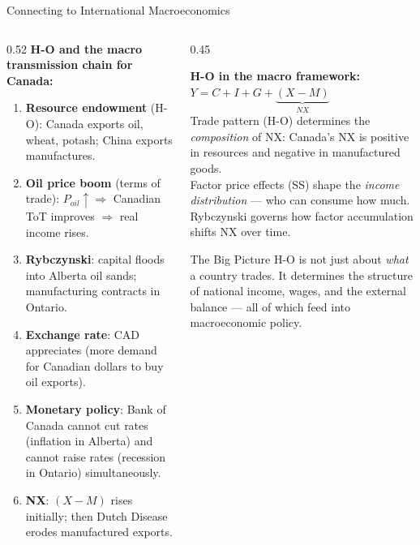 \documentclass[aspectratio=169]{beamer}
\begin{document}
\begin{frame}[shrink=15]{Connecting to International Macroeconomics}
\begin{columns}[T]
\begin{column}{0.52\textwidth}
\textbf{H-O and the macro transmission chain for Canada:}
\begin{enumerate}\small
  \item \textbf{Resource endowment} (H-O): Canada exports
        oil, wheat, potash; China exports manufactures.
  \item \textbf{Oil price boom} (terms of trade):
        $P_{oil}\uparrow \Rightarrow$ Canadian ToT improves
        $\Rightarrow$ real income rises.
  \item \textbf{Rybczynski}: capital floods into Alberta
        oil sands; manufacturing contracts in Ontario.
  \item \textbf{Exchange rate}: CAD appreciates (more
        demand for Canadian dollars to buy oil exports).
  \item \textbf{Monetary policy}: Bank of Canada cannot
        cut rates (inflation in Alberta) and cannot
        raise rates (recession in Ontario) simultaneously.
  \item \textbf{NX}: $(X-M)$ rises initially; then Dutch
        Disease erodes manufactured exports.
\end{enumerate}
\end{column}
\begin{column}{0.45\textwidth}
\begin{varbox}
\small\textbf{H-O in the macro framework:}\\[0.3em]
$Y = C + I + G + \underbrace{(X-M)}_{NX}$\\[0.3em]
Trade pattern (H-O) determines the \emph{composition}
of NX: Canada's NX is positive in resources and
negative in manufactured goods.\\[0.3em]
Factor price effects (SS) shape the \emph{income
distribution} --- who can consume how much.\\[0.3em]
Rybczynski governs how factor accumulation
shifts NX over time.
\end{varbox}
\vspace{0.3em}
\begin{insight}{The Big Picture}
\small H-O is not just about \emph{what} a country
trades. It determines the structure of national
income, wages, and the external balance ---
all of which feed into macroeconomic policy.
\end{insight}
\end{column}
\end{columns}
\end{frame}
\end{document}
